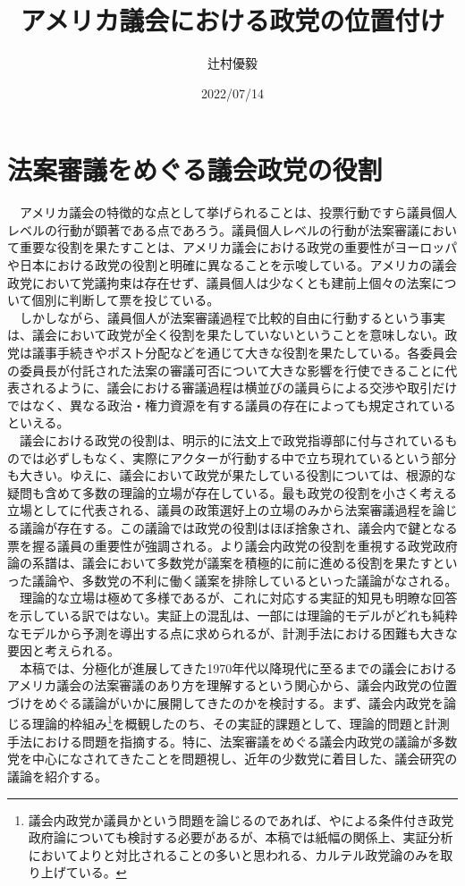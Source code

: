 \documentclass{article}
\title{アメリカ議会における政党の位置付け}
\author{辻村優毅}
\date{2022/07/14}
\begin{document}
\maketitle

\section{法案審議をめぐる議会政党の役割}
　アメリカ議会の特徴的な点として挙げられることは、投票行動ですら議員個人レベルの行動が顕著である点であろう。議員個人レベルの行動が法案審議において重要な役割を果たすことは、アメリカ議会における政党の重要性がヨーロッパや日本における政党の役割と明確に異なることを示唆している。アメリカの議会政党において党議拘束は存在せず、議員個人は少なくとも建前上個々の法案について個別に判断して票を投じている。\\
　しかしながら、議員個人が法案審議過程で比較的自由に行動するという事実は、議会において政党が全く役割を果たしていないということを意味しない。政党は議事手続きやポスト分配などを通じて大きな役割を果たしている。各委員会の委員長が付託された法案の審議可否について大きな影響を行使できることに代表されるように、議会における審議過程は横並びの議員らによる交渉や取引だけではなく、異なる政治・権力資源を有する議員の存在によっても規定されているといえる。\\
　議会における政党の役割は、明示的に法文上で政党指導部に付与されているものでは必ずしもなく、実際にアクターが行動する中で立ち現れているという部分も大きい。ゆえに、議会において政党が果たしている役割については、根源的な疑問も含めて多数の理論的立場が存在している。最も政党の役割を小さく考える立場として\citet*{Krehbiel1998-ob,Krehbiel2010-ob}に代表される、議員の政策選好上の立場のみから法案審議過程を論じる議論が存在する。この議論では政党の役割はほぼ捨象され、議会内で鍵となる票を握る議員の重要性が強調される。より議会内政党の役割を重視する政党政府論の系譜は、議会において多数党が議案を積極的に前に進める役割を果たす\citep*{Rohde1991-da,Aldrich1995-xf}といった議論や、多数党の不利に働く議案を排除している\citep*{Cox2005-pn,Cox2007-xq}といった議論がなされる。\\
　理論的な立場は極めて多様であるが、これに対応する実証的知見も明瞭な回答を示している訳ではない。実証上の混乱は、一部には理論的モデルがどれも純粋なモデルから予測を導出する点に求められるが、計測手法における困難も大きな要因と考えられる。\\
　本稿では、分極化が進展してきた1970年代以降現代に至るまでの議会におけるアメリカ議会の法案審議のあり方を理解するという関心から、議会内政党の位置づけをめぐる議論がいかに展開してきたのかを検討する。まず、議会内政党を論じる理論的枠組み\footnote{議会内政党か議員かという問題を論じるのであれば、\citet*{Rohde1991-da}や\citet{Aldrich1995-xf}による条件付き政党政府論についても検討する必要があるが、本稿では紙幅の関係上、実証分析においてより\citet*{Krehbiel1998-ob,Krehbiel2010-ob}と対比されることの多いと思われる、カルテル政党論\citep*{Cox2005-pn,Cox2007-xq}のみを取り上げている。}を概観したのち、その実証的課題として、理論的問題と計測手法における問題を指摘する。特に、法案審議をめぐる議会内政党の議論が多数党を中心になされてきたことを問題視し、近年の少数党に着目した、議会研究の議論を紹介する。\\
\end{document}
